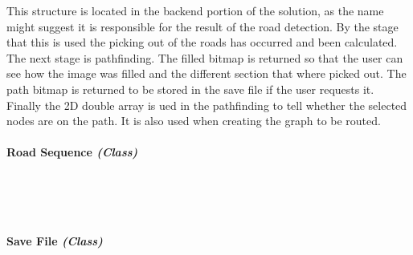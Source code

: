 \begin{FlushLeft}
    This structure is located in the backend portion of the solution, as the name might suggest it is responsible for the result of the road detection. By the stage that this is used the picking out of the roads has occurred and been calculated. The next stage is pathfinding. The filled bitmap is returned so that the user can see how the image was filled and the different section that where picked out. The path bitmap is returned to be stored in the save file if the user requests it. Finally the 2D double array is ued in the pathfinding to tell whether the selected nodes are on the path. It is also used when creating the graph to be routed.\\

    \bk

    \pagebreak
\paragraph{Road Sequence \textit{(Class)}} \mbox{} \\

    \begin{figure}[H]
        \centering
    \end{figure}\\

    \bk

    
    \pagebreak
\paragraph{Save File \textit{(Class)}} \mbox{} \\

    \begin{figure}[H]
        \centering
    \end{figure}\\


\end{FlushLeft}
